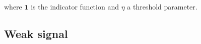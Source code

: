 \documentclass{article} %
\newcommand{\ts}{y}
\newcommand{\tspred}{\hat{\ts}}
\newcommand{\stat}{f}
\newcommand{\statparam}{\theta_{stat}}
\newcommand{\lag}{h}
\newcommand{\meants}{\Bar{\ts}}
\newcommand{\rnnwindow}{{\bf \rnn}}
\newcommand{\rnn}{z}
\newcommand{\err}{err}
\newcommand{\rnnmodel}{\textsc{rnn}}
\newcommand{\threshold}{\eta}
\begin{document}
where $\mathbf{1}$ is the indicator function and $\threshold$ a threshold parameter.


\subsection{Weak signal}
\end{document}

